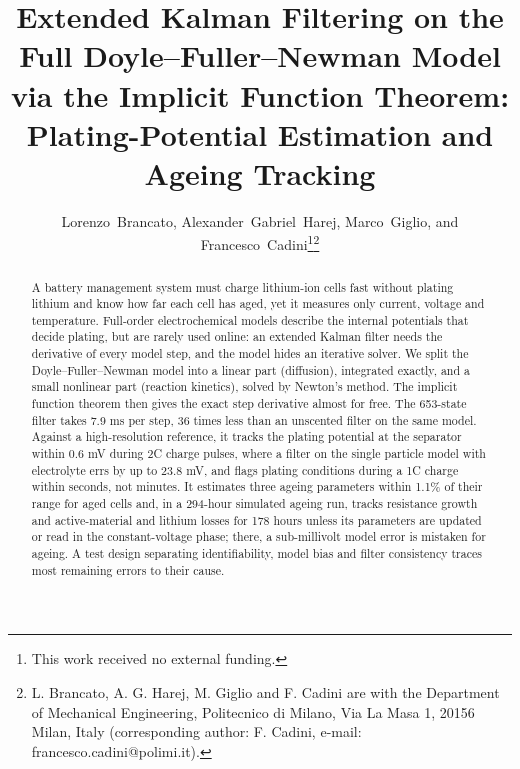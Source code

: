 \documentclass[journal]{IEEEtran}
\begin{document}
\title{Extended Kalman Filtering on the Full Doyle--Fuller--Newman Model via the Implicit Function Theorem: Plating-Potential Estimation and Ageing Tracking}

\author{Lorenzo~Brancato, Alexander~Gabriel~Harej, Marco~Giglio, and Francesco~Cadini\thanks{This work received no external funding.}\thanks{L. Brancato, A. G. Harej, M. Giglio and F. Cadini are with the Department of Mechanical Engineering, Politecnico di Milano, Via La Masa 1, 20156 Milan, Italy (corresponding author: F. Cadini, e-mail: francesco.cadini@polimi.it).}}


\maketitle

\begin{abstract}A battery management system must charge lithium-ion cells fast without plating lithium and know how far each cell has aged, yet it measures only current, voltage and temperature. Full-order electrochemical models describe the internal potentials that decide plating, but are rarely used online: an extended Kalman filter needs the derivative of every model step, and the model hides an iterative solver. We split the Doyle--Fuller--Newman model into a linear part (diffusion), integrated exactly, and a small nonlinear part (reaction kinetics), solved by Newton's method. The implicit function theorem then gives the exact step derivative almost for free. The 653-state filter takes 7.9 ms per step, 36 times less than an unscented filter on the same model. Against a high-resolution reference, it tracks the plating potential at the separator within 0.6 mV during 2C charge pulses, where a filter on the single particle model with electrolyte errs by up to 23.8 mV, and flags plating conditions during a 1C charge within seconds, not minutes. It estimates three ageing parameters within 1.1\% of their range for aged cells and, in a 294-hour simulated ageing run, tracks resistance growth and active-material and lithium losses for 178 hours unless its parameters are updated or read in the constant-voltage phase; there, a sub-millivolt model error is mistaken for ageing. A test design separating identifiability, model bias and filter consistency traces most remaining errors to their cause.
\end{abstract}
\end{document}
